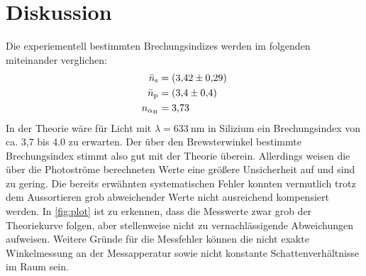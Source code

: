 \section{Diskussion}
\label{sec:Diskussion}
Die experiementell bestimmten Brechungsindizes werden im folgenden miteinander verglichen:
\begin{align*}
    \bar{n}_{\text{s}}&=\qty{3.42+-0.29}{} \\
    \bar{n}_{\text{p}}&=\qty{3.4+-0.4}{} \\
    n_{\alpha_\text{B}}&=\qty{3.73}{}
\end{align*}
In der Theorie wäre für Licht mit $\lambda=\qty{633}{\nano\meter}$ in Silizium ein Brechungsindex von ca. 3,7 bis 4.0
zu erwarten.
Der über den Brewsterwinkel bestimmte Brechungsindex stimmt also gut mit der Theorie überein.
Allerdings weisen die über die Photoströme berechneten Werte eine größere Unsicherheit auf und sind zu gering.
Die bereits erwähnten systematischen Fehler konnten vermutlich trotz dem Aussortieren grob abweichender
Werte nicht ausreichend kompensiert werden.
In \autoref{fig:plot} ist zu erkennen, dass die Messwerte zwar grob der Theoriekurve folgen, aber
stellenweise nicht zu vernachlässigende Abweichungen aufweisen.
Weitere Gründe für die Messfehler können die nicht exakte Winkelmessung an der Messapperatur sowie nicht konstante
Schattenverhältnisse im Raum sein.